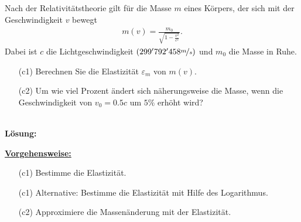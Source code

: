 \subsection*{}
Nach der Relativitätstheorie gilt für die Masse $ m $ eines Körpers, der sich mit der Geschwindigkeit $ v $ bewegt
\begin{align*}
	m(v)
	=
	\frac{m_0}{\sqrt{1 - \frac{v^2}{c^2}}}.
\end{align*}
Dabei ist $ c $ die Lichtgeschwindigkeit $ (299'792'458 \nicefrac{m}{s}) $ und $ m_0 $ die Masse in Ruhe.
\begin{enumerate}
	\item[(c1)] Berechnen Sie die Elastizität $ \varepsilon_m $ von $ m(v) $.
	\item[(c2)] Um wie viel Prozent ändert sich näherungsweise die Masse, wenn die Geschwindigkeit von $ v_0 = 0.5c $ um $ 5 \% $ erhöht wird?
\end{enumerate}
\ \\
\textbf{Lösung:}
\begin{mdframed}
\underline{\textbf{Vorgehensweise:}}
\begin{enumerate}
\item[(c1)] Bestimme die Elastizität.
\item[(c1)] Alternative: Bestimme die Elastizität mit Hilfe des Logarithmus.
\item[(c2)] Approximiere die Massenänderung mit der Elastizität.
\end{enumerate}
\end{mdframed}

